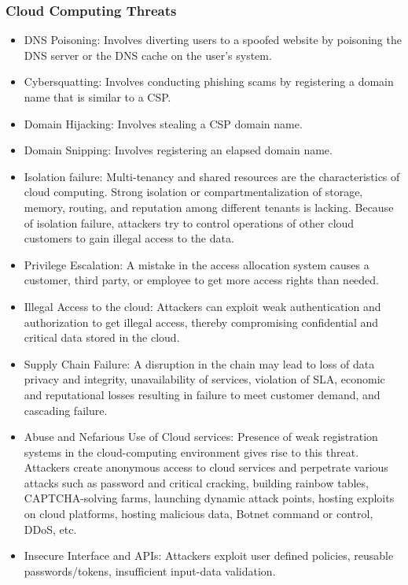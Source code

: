 \subsubsection{Cloud Computing Threats}
\begin{itemize}
    \item DNS Poisoning: Involves diverting users to a spoofed website by poisoning the DNS server or the DNS cache on the user's system.
    \item Cybersquatting: Involves conducting phishing scams by registering a domain name that is similar to a CSP.
    \item Domain Hijacking: Involves stealing a CSP domain name.
    \item Domain Snipping: Involves registering an elapsed domain name.
    \item Isolation failure: Multi-tenancy and shared resources are the characteristics of cloud computing. Strong isolation or compartmentalization of storage, memory, routing, and reputation among different tenants is lacking. Because of isolation failure, attackers try to control operations of other cloud customers to gain illegal access to the data.
    \item Privilege Escalation: A mistake in the access allocation system causes a customer, third party, or employee to get more access rights than needed.
    \item Illegal Access to the cloud: Attackers can exploit weak authentication and authorization to get illegal access, thereby compromising confidential and critical data stored in the cloud.
    \item Supply Chain Failure: A disruption in the chain may lead to loss of data privacy and integrity, unavailability of services, violation of SLA, economic and reputational losses resulting in failure to meet customer demand, and cascading failure.
    \item Abuse and Nefarious Use of Cloud services: Presence of weak registration systems in the cloud-computing environment gives rise to this threat. Attackers create anonymous access to cloud services and perpetrate various attacks such as password and critical cracking, building rainbow tables, CAPTCHA-solving farms, launching dynamic attack points, hosting exploits on cloud platforms, hosting malicious data, Botnet command or control, DDoS, etc.
    \item Insecure Interface and APIs: Attackers exploit user defined policies, reusable passwords/tokens, insufficient input-data validation.

\end{itemize}
